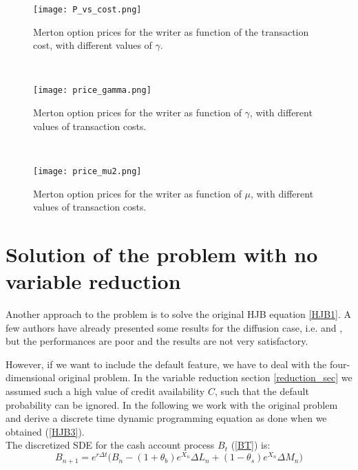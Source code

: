 \begin{figure}[t!]
 \begin{minipage}[b]{0.5\linewidth}
   \centering
   \texttt{[image: P\_vs\_cost.png]}
   \caption{Merton option prices for the writer as function of the transaction cost, with different values of $\gamma$.}
   \label{Fig10} 
 \end{minipage}
 \ \hspace{2mm} \hspace{3mm} \
 \begin{minipage}[b]{0.5\linewidth}
  \centering
   \texttt{[image: price\_gamma.png]}
   \caption{Merton option prices for the writer as function of $\gamma$, with different values of transaction costs.}
   \label{Fig11}
 \end{minipage}
  \ \hspace{2mm} \hspace{3mm} \
  \begin{minipage}[b]{\linewidth}
  \centering
   \texttt{[image: price\_mu2.png]}
   \caption{Merton option prices for the writer as function of $\mu$, with different values of transaction costs.}
   \label{Fig12}
 \end{minipage}
\end{figure}



\section{Solution of the problem with no variable reduction}


Another approach to the problem is to solve the original HJB equation \ref{HJB1}. 
A few authors have already presented some results for the diffusion case, i.e. \cite{Song14} and \cite{Pal15}, but the performances are poor and the results are not very satisfactory.

However, if we want to include the default feature, we have to deal with the four-dimensional original problem. In the variable reduction section \ref{reduction_sec}
we assumed such a high value of credit availability $C$, such that the default probability can be ignored. 
In the following we work with the original problem and derive a discrete time dynamic programming equation as done when we obtained (\ref{HJB3}).\\
The discretized SDE for the cash account process $B_t$ (\ref{BT}) is:
\begin{equation}
 B_{n+1} =  e^{r \Delta t} \biggl( B_n - (1+\theta_b) e^{X_n} \Delta L_n + (1-\theta_s) e^{X_n} \Delta M_n \biggr)
\end{equation}

